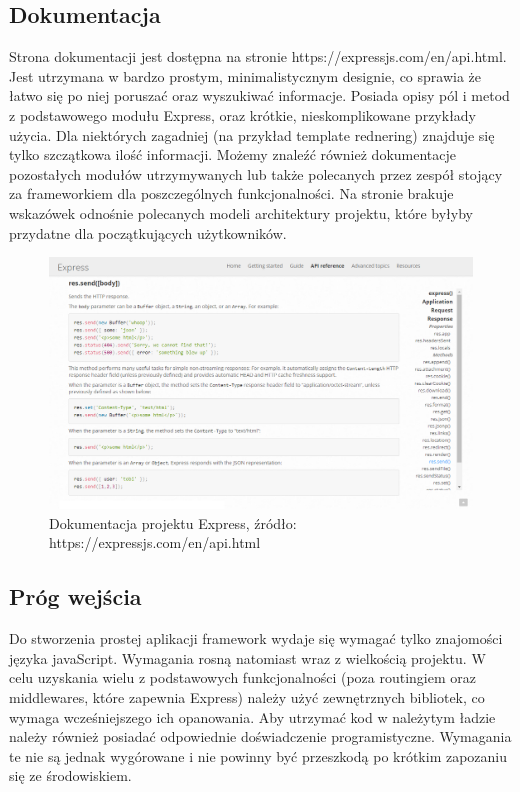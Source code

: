 \documentclass[12pt]{report}
\begin{document}
    \subsection{Dokumentacja}
      Strona dokumentacji jest dostępna na stronie https://expressjs.com/en/api.html.
      Jest utrzymana w bardzo prostym, minimalistycznym designie, co sprawia że łatwo się po niej poruszać oraz wyszukiwać informacje.
      Posiada opisy pól i metod z podstawowego modułu Express, oraz krótkie, nieskomplikowane przykłady użycia.
      Dla niektórych zagadniej (na przykład template rednering) znajduje się tylko szczątkowa ilość informacji.
      Możemy znaleźć również dokumentacje pozostałych modułów utrzymywanych lub także polecanych przez zespół stojący za frameworkiem dla poszczególnych funkcjonalności.
      Na stronie brakuje wskazówek odnośnie polecanych modeli architektury projektu, które byłyby przydatne dla początkujących użytkowników.
      \begin{figure}[!hb]
        \centering
        \includegraphics[width=\textwidth,height=\textheight,keepaspectratio]{doc_express.png} 
        \caption{Dokumentacja projektu Express, źródło: https://expressjs.com/en/api.html}
      \end{figure}

    \subsection{Próg wejścia}
      Do stworzenia prostej aplikacji framework wydaje się wymagać tylko znajomości języka javaScript.
      Wymagania rosną natomiast wraz z wielkością projektu.
      W celu uzyskania wielu z podstawowych funkcjonalności (poza routingiem oraz middlewares, które zapewnia Express) należy użyć zewnętrznych bibliotek, co wymaga wcześniejszego ich opanowania. 
      Aby utrzymać kod w należytym ładzie należy również posiadać odpowiednie doświadczenie programistyczne.
      Wymagania te nie są jednak wygórowane i nie powinny być przeszkodą po krótkim zapozaniu się ze środowiskiem.
\end{document}
